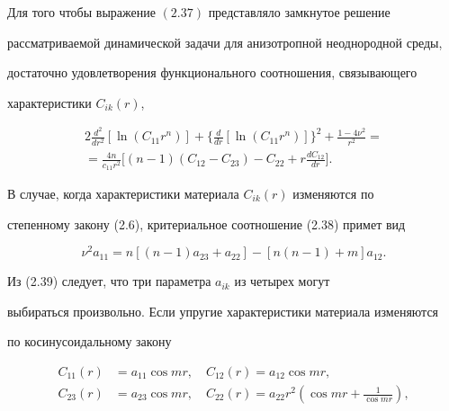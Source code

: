  


\begin{thm} 


Для того чтобы выражение $(2.37)$ представляло замкнутое решение 


рассматриваемой динамической задачи для анизотропной неоднородной среды, 


достаточно удовлетворения функционального соотношения, связывающего 


характеристики $C_{ik}(r)$, 


\begin{multline} 


2\frac{d^2}{dr^2}[\ln(C_{11}r^n)]+\biggl\{\frac{d}{dr} 


[\ln(C_{11}r^n)]\biggr\}^2+\frac{1-4\nu^2}{r^2}= \\


=\frac{4n}{c_{11}r^2}\biggl[(n-1)(C_{12}-C_{23})-C_{22}+ 


r\frac{d C_{12}}{dr}\biggr]. 


\end{multline} 


\end{thm} 


 


В случае, когда характеристики материала $C_{ik}(r)$ изменяются по 


степенному закону (2.6), критериальное соотношение (2.38) примет вид 


\begin{equation} 


\nu^2a_{11}=n[(n-1)a_{23}+a_{22}]-[n(n-1)+m]a_{12}. 


\end{equation} 


Из (2.39) следует, что три параметра $a_{ik}$ из четырех могут 


выбираться произвольно. Если упругие характеристики материала изменяются 


по косинусоидальному закону 


\begin{equation} 


\begin{split} 


C_{11}(r)&=a_{11}\cos mr,\quad C_{12}(r)=a_{12}\cos mr, \\ 


C_{23}(r)&=a_{23}\cos mr,\quad C_{22}(r)=a_{22}r^2 


\left(\cos mr+\tfrac{1}{\cos mr}\right), 


\end{split} 


\end{equation} 


